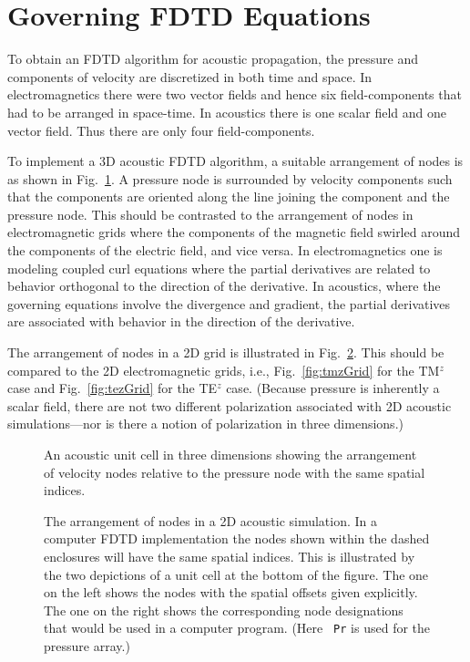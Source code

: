 \section{Governing FDTD Equations}

To obtain an FDTD algorithm for acoustic propagation, the pressure and
components of velocity are discretized in both time and space.  In
electromagnetics there were two vector fields and hence six
field-components that had to be arranged in space-time.  In acoustics
there is one scalar field and one vector field.  Thus there are only
four field-components.

To implement a 3D acoustic FDTD algorithm, a suitable arrangement of
nodes is as shown in Fig.\ \ref{fig:acousticCell}.  A pressure node is
surrounded by velocity components such that the components are
oriented along the line joining the component and the pressure node.
This should be contrasted to the arrangement of nodes in
electromagnetic grids where the components of the magnetic field
swirled around the components of the electric field, and vice versa.
In electromagnetics one is modeling coupled curl equations where the
partial derivatives are related to behavior orthogonal to the
direction of the derivative.  In acoustics, where the governing
equations involve the divergence and gradient, the partial derivatives
are associated with behavior in the direction of the derivative.

The arrangement of nodes in a 2D grid is illustrated in Fig.\
\ref{fig:acousticGridTwoD}.  This should be compared to the 2D
electromagnetic grids, i.e., Fig.\ \ref{fig:tmzGrid} for the TM$^z$
case and Fig.\ \ref{fig:tezGrid} for the TE$^z$ case.  (Because
pressure is inherently a scalar field, there are not two different
polarization associated with 2D acoustic simulations---nor is there a
notion of polarization in three dimensions.)
\begin{figure}
  \begin{center}
  \end{center}
  \caption{An acoustic unit cell in three dimensions showing the
  arrangement of velocity nodes relative to the pressure node with the
  same spatial indices.}
  \label{fig:acousticCell}
\end{figure}
\begin{figure}
  \begin{center}
  \end{center}
  \caption{The arrangement of nodes in a 2D acoustic simulation.  In
  a computer FDTD implementation the nodes shown within the dashed
  enclosures will have the same spatial indices.  This is illustrated
  by the two depictions of a unit cell at the bottom of the figure.
  The one on the left shows the nodes with the spatial offsets given
  explicitly.  The one on the right shows the corresponding node
  designations that would be used in a computer program.  (Here {\tt
  Pr} is used for the pressure array.)}
  \label{fig:acousticGridTwoD}
\end{figure}

